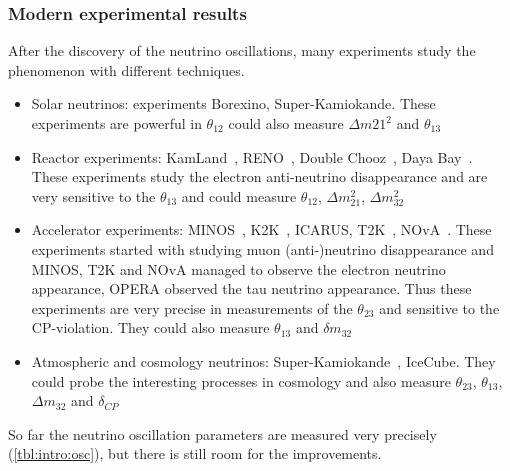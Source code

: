 \documentclass[../main.tex]{subfiles}
\begin{document}
\subsubsection{Modern experimental results}
After the discovery of the neutrino oscillations, many experiments study the phenomenon with different techniques.
\begin{itemize}
  \item Solar neutrinos: experiments Borexino, Super-Kamiokande. These experiments are powerful in $\theta_{12}$ could also measure $\Delta m{21}^2$ and $\theta_{13}$
  \item Reactor experiments: KamLand~\cite{Eguchi2003}, RENO~\cite{Ahn2012}, Double Chooz~\cite{Abe2014}, Daya Bay~\cite{An2014}. These experiments study the electron anti-neutrino disappearance and are very sensitive to the $\theta_{13}$ and could measure $\theta_{12}$, $\Delta m_{21}^2$, $\Delta m_{32}^2$
  \item Accelerator experiments: MINOS~\cite{Adamson2014}, K2K~\cite{Ahn2006}, ICARUS, T2K~\cite{Abe2020a}, NOvA~\cite{Acero2019}. These experiments started with studying muon (anti-)neutrino disappearance and MINOS, T2K and NOvA managed to observe the electron neutrino appearance, OPERA observed the tau neutrino appearance. Thus these experiments are very precise in measurements of the $\theta_{23}$ and sensitive to the CP-violation. They could also measure $\theta_{13}$ and $\delta m_{32}$
  \item Atmospheric and cosmology neutrinos: Super-Kamiokande~\cite{Jiang2019}, IceCube. They could probe the interesting processes in cosmology and also measure $\theta_{23}$, $\theta_{13}$, $\Delta m_{32}$ and $\delta_{CP}$
\end{itemize}

So far the neutrino oscillation parameters are measured very precisely (\autoref{tbl:intro:osc}), but there is still room for the improvements.
\end{document}
